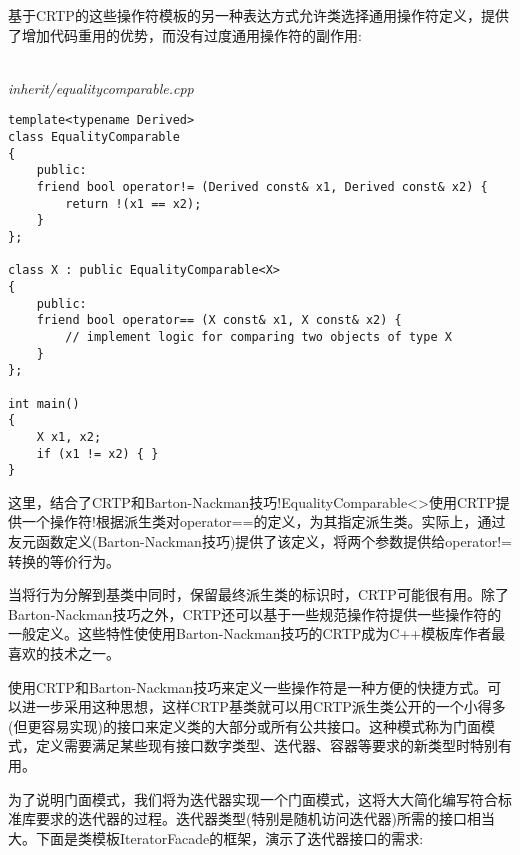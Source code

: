 基于CRTP的这些操作符模板的另一种表达方式允许类选择通用操作符定义，提供了增加代码重用的优势，而没有过度通用操作符的副作用:

\hspace*{\fill} \\ %
\noindent
\textit{inherit/equalitycomparable.cpp}
\begin{lstlisting}[style=styleCXX]
template<typename Derived>
class EqualityComparable
{
	public:
	friend bool operator!= (Derived const& x1, Derived const& x2) {
		return !(x1 == x2);
	}
};

class X : public EqualityComparable<X>
{
	public:
	friend bool operator== (X const& x1, X const& x2) {
		// implement logic for comparing two objects of type X
	}
};

int main()
{
	X x1, x2;
	if (x1 != x2) { }
}
\end{lstlisting}

这里，结合了CRTP和Barton-Nackman技巧!EqualityComparable<>使用CRTP提供一个操作符!根据派生类对operator==的定义，为其指定派生类。实际上，通过友元函数定义(Barton-Nackman技巧)提供了该定义，将两个参数提供给operator!=转换的等价行为。

当将行为分解到基类中同时，保留最终派生类的标识时，CRTP可能很有用。除了Barton-Nackman技巧之外，CRTP还可以基于一些规范操作符提供一些操作符的一般定义。这些特性使使用Barton-Nackman技巧的CRTP成为C++模板库作者最喜欢的技术之一。


使用CRTP和Barton-Nackman技巧来定义一些操作符是一种方便的快捷方式。可以进一步采用这种思想，这样CRTP基类就可以用CRTP派生类公开的一个小得多(但更容易实现)的接口来定义类的大部分或所有公共接口。这种模式称为门面模式，定义需要满足某些现有接口数字类型、迭代器、容器等要求的新类型时特别有用。

为了说明门面模式，我们将为迭代器实现一个门面模式，这将大大简化编写符合标准库要求的迭代器的过程。迭代器类型(特别是随机访问迭代器)所需的接口相当大。下面是类模板IteratorFacade的框架，演示了迭代器接口的需求:

